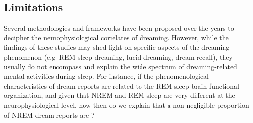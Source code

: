 \subsection{Limitations}
\label{sec:dream-research:attempts:limitations}

Several methodologies and frameworks have been proposed over the years to decipher the neurophysiological correlates of dreaming. However, while the findings of these studies may shed light on specific aspects of the dreaming phenomenon (e.g. REM sleep dreaming, lucid dreaming, dream recall), they usually do not encompass and explain the wide spectrum of dreaming-related mental activities during sleep. For instance, if the phenomenological characteristics of dream reports are related to the REM sleep brain functional organization, and given that NREM and REM sleep are very different at the neurophysiological level, how then do we explain that a non-negligible proportion of NREM dream reports are  \citep{hobson_dreaming_1988}?

